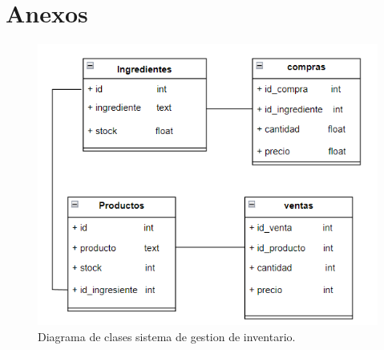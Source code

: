 \fancyhead{}
\fancyfoot{}
\cfoot{\thepage}


\chapter{Anexos}

\begin{figure}[H]
  \begin{center}
    \includegraphics[scale=0.70]{./diagrama de clases.png}
    \caption{Diagrama de clases sistema de
    gestion de inventario.}
    \label{fig:product}
  \end{center}
\end{figure}

